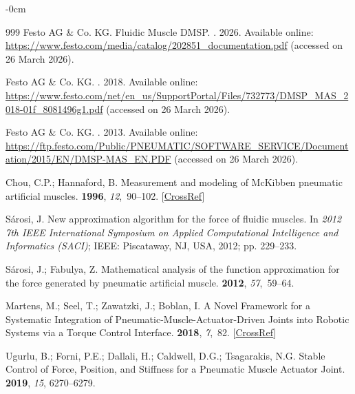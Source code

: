 \documentclass[actuators,article,accept,pdftex,moreauthors]{Definitions/mdpi}
\begin{document}
\begin{adjustwidth}{-\extralength}{0cm}
\begin{thebibliography}{999}
{Festo AG \& Co. KG}.
\newblock Fluidic Muscle DMSP.
.{ 2026.} 
Available online:
\url{https://www.festo.com/media/catalog/202851_documentation.pdf} (accessed
on 26 March 2026).

{Festo AG \& Co. KG}.
. {2018.} 
Available online:
\url{https://www.festo.com/net/en_us/SupportPortal/Files/732773/DMSP_MAS_2018-01f_8081496g1.pdf}
(accessed on 26 March 2026).

{Festo AG \& Co. KG}.
. {2013.} 
Available online:
\url{https://ftp.festo.com/Public/PNEUMATIC/SOFTWARE_SERVICE/Documentation/2015/EN/DMSP-MAS_EN.PDF}
(accessed on 26 March 2026).

Chou, C.P.; Hannaford, B.
\newblock Measurement and modeling of {McKibben} pneumatic artificial muscles.
 {\bf 1996}, {\em
12},~90--102. [\href{http://dx.doi.org/10.1109/70.481753}{CrossRef}]

Sárosi, J.
\newblock New approximation algorithm for the force of fluidic muscles.
\newblock In \emph{{2012 7th IEEE International Symposium on Applied Computational Intelligence and Informatics (SACI)}}; IEEE: {Piscataway, NJ, USA,}
2012; pp. 229--233.

Sárosi, J.; Fabulya, Z.
\newblock Mathematical analysis of the function approximation for the force
generated by pneumatic artificial muscle.
 {\bf 2012}, {\em 57},~59--64.

Martens, M.; Seel, T.; Zawatzki, J.; Boblan, I.
\newblock A {Novel} {Framework} for a {Systematic} {Integration} of
{Pneumatic}-{Muscle}-{Actuator}-{Driven} {Joints} into {Robotic} {Systems}
{via} a {Torque} {Control} {Interface}.
 {\bf 2018}, {\em 7},~82. [\href{http://dx.doi.org/10.3390/act7040082}{CrossRef}]

Ugurlu, B.; Forni, P.E.; Dallali, H.; Caldwell, D.G.; Tsagarakis, N.G.
\newblock Stable {Control} of {Force}, {Position}, and {Stiffness} for a
{Pneumatic} {Muscle} {Actuator} {Joint}.
 {\bf 2019}, {\em
15}, {6270--6279.} 


\end{thebibliography}
\end{adjustwidth}
\end{document}
